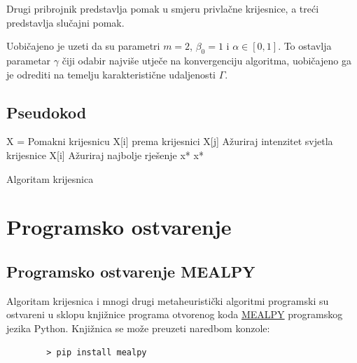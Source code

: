Drugi pribrojnik predstavlja pomak u smjeru privlačne krijesnice, a treći predstavlja slučajni pomak. 

Uobičajeno je uzeti da su parametri $m = 2$, $\beta_0 = 1$ i $\alpha \in [0, 1]$. To ostavlja parametar $\gamma$ čiji odabir najviše utječe na konvergenciju algoritma, uobičajeno ga je odrediti na temelju karakteristične udaljenosti $\Gamma$.

\subsection{Pseudokod}

\begin{algorithm}[H]
	\begin{algorithmic}[1]
		
		\State X = 
		\State Pomakni krijesnicu X[i] prema krijesnici X[j]
		\State Ažuriraj intenzitet svjetla krijesnice X[i]
		\EndIf
		\EndFor
		\EndFor
		\State Ažuriraj najbolje rješenje x*
		\EndWhile
		\State \Return x*	
		\EndFunction
	\end{algorithmic}
	\caption{Algoritam krijesnica}
\end{algorithm}

\section{Programsko ostvarenje}
\subsection{Programsko ostvarenje MEALPY}
Algoritam krijesnica i mnogi drugi metaheuristički algoritmi programski su ostvareni u sklopu knjižnice programa otvorenog koda \href{https://mealpy.readthedocs.io/en/latest}{MEALPY} programskog jezika Python. Knjižnica se može preuzeti naredbom konzole:


\begin{framed}
	\begin{verbatim}
		> pip install mealpy
	\end{verbatim}
\end{framed}

